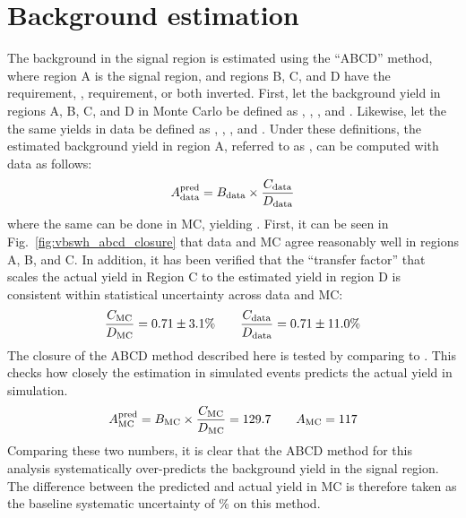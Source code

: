 \section{Background estimation}
The background in the signal region is estimated using the ``ABCD'' method, where region A is the signal region, and regions B, C, and D have the \detajj requirement, \MSD, requirement, or both inverted. %
First, let the background yield in regions A, B, C, and D in Monte Carlo be defined as \AMC, \BMC, \CMC, and \DMC.
Likewise, let the the same yields in data be defined as  \Adata, \Bdata, \Cdata, and \Ddata.
Under these definitions, the estimated background yield in region A, referred to as \AdataPred, can be computed with data as follows:
\begin{equation}\label{eq:vbswh_abcd}
    A_{\text{data}}^{\text{pred}} = B_{\text{data}}\times\frac{C_{\text{data}}}{D_{\text{data}}}
\end{equation}
\noindent where the same can be done in MC, yielding \AMCPred. 
First, it can be seen in Fig.~\ref{fig:vbswh_abcd_closure} that data and MC agree reasonably well in regions A, B, and C. 
In addition, it has been verified that the ``transfer factor'' that scales the actual yield in Region C to the estimated yield in region D is consistent within statistical uncertainty across data and MC:
\begin{equation*}
    \frac{C_{\mathrm{MC}}}{D_{\mathrm{MC}}} = 0.71 \pm 3.1\% \qquad \frac{C_{\text{data}}}{D_{\text{data}}} = 0.71 \pm 11.0\%
\end{equation*}
The closure of the ABCD method described here is tested by comparing \AMCPred to \AMC. 
This checks how closely the estimation in simulated events predicts the actual yield in simulation. 
\begin{equation*}
    A_{\mathrm{MC}}^{\text{pred}} = B_{\mathrm{MC}}\times\frac{C_{\mathrm{MC}}}{D_{\mathrm{MC}}} = 129.7 \qquad A_{\mathrm{MC}} = 117
\end{equation*}
Comparing these two numbers, it is clear that the ABCD method for this analysis systematically over-predicts the background yield in the signal region. 
The difference between the predicted and actual yield in MC is therefore taken as the baseline systematic uncertainty of \BkgEstMethodSystErr\% on this method. 

